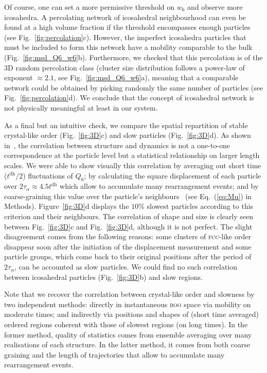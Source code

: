 Of course, one can set a more permissive threshold on $w_6$ and observe more icosahedra. A percolating network of icosahedral neighbourhood can even be found at a high volume fraction if the threshold encompasses enough particles (see Fig.~\ref{fig:percolation}c). However, the imperfect icosahedra particles that must be included to form this network have a mobility comparable to the bulk (Fig.~\ref{fig:msd_Q6_w6}b). Furthermore, we checked that this percolation is of the 3D random percolation class (cluster size distribution follows a power-law of exponent $\approx 2.1$, see Fig.~\ref{fig:msd_Q6_w6}a), meaning that a comparable network could be obtained by picking randomly the same number of particles (see Fig.~\ref{fig:percolation}d). We conclude that the concept of icosahedral network is not physically meaningful at least in our system.

As a final but an intuitive check, we compare the spatial repartition of stable crystal-like order (Fig.~\ref{fig:3D}c) and slow particles (Fig.~\ref{fig:3D}d). As shown in~\citep{Berthier2007}, the correlation between structure and dynamics is not a one-to-one correspondence at the particle level but a statistical relationship on larger length scales. We were able to show visually this correlation by averaging out short time ($t^\text{dh}/2$) fluctuations of $Q_6$; by calculating the square displacement of each particle over $2\tau_\alpha\approx 4.5t^\text{dh}$ which allow to accumulate many rearrangement events; and by coarse-graining this value over the particle's neighbours~\citep{Berthier2007} (see Eq.~(\ref{eq:Mu}) in Methods). Figure~\ref{fig:3D}d displays the $10\%$ slowest particles according to this criterion and their neighbours. The correlation of shape and size is clearly seen between Fig.~\ref{fig:3D}c and Fig.~\ref{fig:3D}d, although it is not perfect. The slight disagreement comes from the following reasons: some clusters of \textsc{fcc}-like order disappear soon after the initiation of the displacement measurement and some particle groups, which come back to their original positions after the period of $2\tau_\alpha$, can be accounted as slow particles. We could find no such correlation between icosahedral particles (Fig.~\ref{fig:3D}b) and slow regions.

Note that we recover the correlation between crystal-like order and slowness by two independent methods: directly in instantaneous \textsc{boo} space via mobility on moderate times; and indirectly via positions and shapes of (short time averaged) ordered regions coherent with those of slowest regions (on long times). In the former method, quality of statistics comes from ensemble averaging over many realisations of each structure. In the latter method, it comes from both coarse graining and the length of trajectories that allow to accumulate many rearrangement events.



